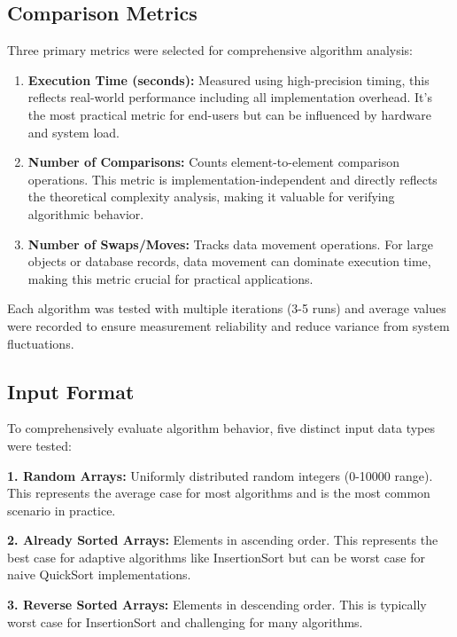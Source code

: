 \documentclass[12pt]{article}
\begin{document}
\subsection{Comparison Metrics}
\hspace{0.8cm} Three primary metrics were selected for comprehensive algorithm analysis:

\begin{enumerate}
    \item \textbf{Execution Time (seconds):} Measured using high-precision timing, this reflects real-world performance including all implementation overhead. It's the most practical metric for end-users but can be influenced by hardware and system load.
    
    \item \textbf{Number of Comparisons:} Counts element-to-element comparison operations. This metric is implementation-independent and directly reflects the theoretical complexity analysis, making it valuable for verifying algorithmic behavior.
    
    \item \textbf{Number of Swaps/Moves:} Tracks data movement operations. For large objects or database records, data movement can dominate execution time, making this metric crucial for practical applications.
\end{enumerate}

Each algorithm was tested with multiple iterations (3-5 runs) and average values were recorded to ensure measurement reliability and reduce variance from system fluctuations.

\subsection{Input Format}
\hspace{0.8cm} To comprehensively evaluate algorithm behavior, five distinct input data types were tested:

\textbf{1. Random Arrays:} Uniformly distributed random integers (0-10000 range). This represents the average case for most algorithms and is the most common scenario in practice.

\textbf{2. Already Sorted Arrays:} Elements in ascending order. This represents the best case for adaptive algorithms like InsertionSort but can be worst case for naive QuickSort implementations.

\textbf{3. Reverse Sorted Arrays:} Elements in descending order. This is typically worst case for InsertionSort and challenging for many algorithms.
\end{document}
